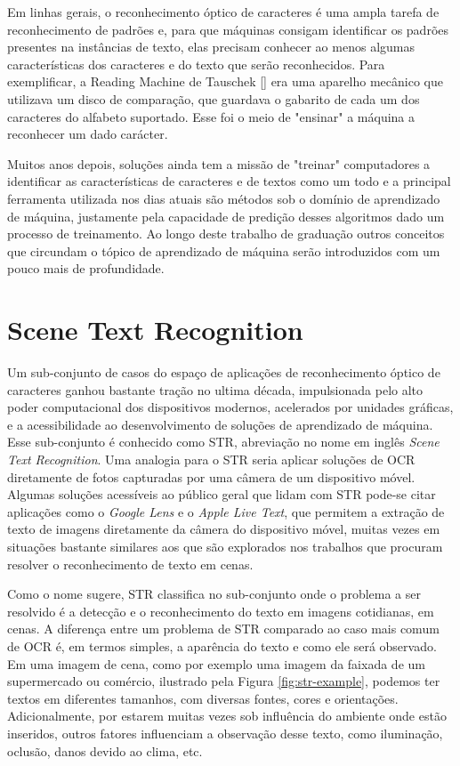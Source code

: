 Em linhas gerais, o reconhecimento óptico de caracteres é uma ampla tarefa de reconhecimento de padrões e, para que máquinas consigam identificar os padrões presentes na instâncias de texto, elas precisam conhecer ao menos algumas características dos caracteres e do texto que serão reconhecidos. Para exemplificar, a Reading Machine de Tauschek [] era uma aparelho mecânico que utilizava um disco de comparação, que guardava o gabarito de cada um dos caracteres do alfabeto suportado. Esse foi o meio de "ensinar" a máquina a reconhecer um dado carácter.

Muitos anos depois, soluções ainda tem a missão de "treinar" computadores a identificar as características de caracteres e de textos como um todo e a principal ferramenta utilizada nos dias atuais são métodos sob o domínio de aprendizado de máquina, justamente pela capacidade de predição desses algoritmos dado um processo de treinamento. Ao longo deste trabalho de graduação outros conceitos que circundam o tópico de aprendizado de máquina serão introduzidos com um pouco mais de profundidade.

\section{Scene Text Recognition}

Um sub-conjunto de casos do espaço de aplicações de reconhecimento óptico de caracteres ganhou bastante tração no ultima década, impulsionada pelo alto poder computacional dos dispositivos modernos, acelerados por unidades gráficas, e a acessibilidade ao desenvolvimento de soluções de aprendizado de máquina. Esse sub-conjunto é conhecido como STR, abreviação no nome em inglês \textit{Scene Text Recognition}. Uma analogia para o STR seria aplicar soluções de OCR diretamente de fotos capturadas por uma câmera de um dispositivo móvel. Algumas soluções acessíveis ao público geral que lidam com STR  pode-se citar aplicações como o \textit{Google Lens} e o \textit{Apple Live Text}, que permitem a extração de texto de imagens diretamente da câmera do dispositivo móvel, muitas vezes em situações bastante similares aos que são explorados nos trabalhos que procuram resolver o reconhecimento de texto em cenas.

Como o nome sugere, STR classifica no sub-conjunto onde o problema a ser resolvido é a detecção e o reconhecimento do texto em imagens cotidianas, em cenas. A diferença entre um problema de STR comparado ao caso mais comum de OCR é, em termos simples, a aparência do texto e como ele será observado. Em uma imagem de cena, como por exemplo uma imagem da faixada de um supermercado ou comércio, ilustrado pela Figura \ref{fig:str-example}, podemos ter textos em diferentes tamanhos, com diversas fontes, cores e orientações. Adicionalmente, por estarem muitas vezes sob influência do ambiente onde estão inseridos, outros fatores influenciam a observação desse texto, como iluminação, oclusão, danos devido ao clima, etc.

